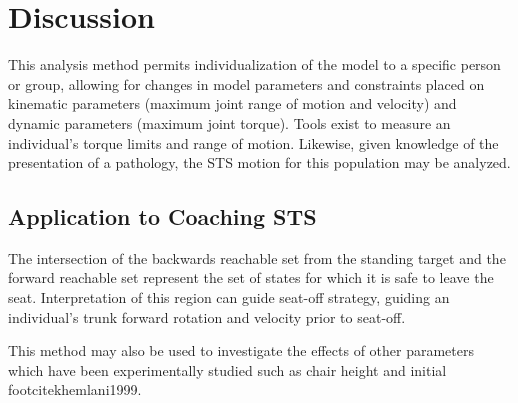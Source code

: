 \section{Discussion}

This analysis method permits individualization of the model to a specific person or group, allowing for changes in model parameters and constraints placed on kinematic parameters (maximum joint range of motion and velocity) and dynamic parameters (maximum joint torque). Tools exist to measure an individual's torque limits and range of motion. Likewise, given knowledge of the presentation of a pathology, the STS motion for this population may be analyzed.
\subsection{Application to Coaching STS}
The intersection of the backwards reachable set from the standing target and the forward reachable set represent the set of states for which it is safe to leave the seat. Interpretation of this region can guide seat-off strategy, guiding an individual's trunk forward rotation and velocity prior to seat-off. 

This method may also be used to investigate the effects of other parameters which have been experimentally studied such as chair height \cite{schenkman1996}and initial footcite{khemlani1999}.
